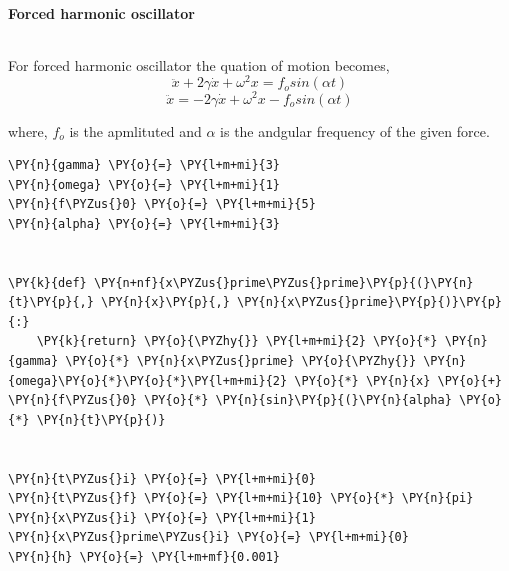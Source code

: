     \hypertarget{forced-harmonic-oscillator}{%
\paragraph{Forced harmonic
oscillator}\label{forced-harmonic-oscillator}}

\[\;\]

    For forced harmonic oscillator the quation of motion becomes,
\[\ddot x + 2 \gamma \dot x + \omega^2 x = f_o sin(\alpha t)\]
\[\ddot x = - 2 \gamma \dot x + \omega^2 x - f_o sin(\alpha t)\]

where, \(f_o\) is the apmlituted and \(\alpha\) is the andgular
frequency of the given force.

    \begin{tcolorbox}[breakable, size=fbox, boxrule=1pt, pad at break*=1mm,colback=cellbackground, colframe=cellborder]
\begin{Verbatim}[commandchars=\\\{\}]
\PY{n}{gamma} \PY{o}{=} \PY{l+m+mi}{3}
\PY{n}{omega} \PY{o}{=} \PY{l+m+mi}{1}
\PY{n}{f\PYZus{}0} \PY{o}{=} \PY{l+m+mi}{5}
\PY{n}{alpha} \PY{o}{=} \PY{l+m+mi}{3}


\PY{k}{def} \PY{n+nf}{x\PYZus{}prime\PYZus{}prime}\PY{p}{(}\PY{n}{t}\PY{p}{,} \PY{n}{x}\PY{p}{,} \PY{n}{x\PYZus{}prime}\PY{p}{)}\PY{p}{:}
    \PY{k}{return} \PY{o}{\PYZhy{}} \PY{l+m+mi}{2} \PY{o}{*} \PY{n}{gamma} \PY{o}{*} \PY{n}{x\PYZus{}prime} \PY{o}{\PYZhy{}} \PY{n}{omega}\PY{o}{*}\PY{o}{*}\PY{l+m+mi}{2} \PY{o}{*} \PY{n}{x} \PY{o}{+} \PY{n}{f\PYZus{}0} \PY{o}{*} \PY{n}{sin}\PY{p}{(}\PY{n}{alpha} \PY{o}{*} \PY{n}{t}\PY{p}{)}


\PY{n}{t\PYZus{}i} \PY{o}{=} \PY{l+m+mi}{0}
\PY{n}{t\PYZus{}f} \PY{o}{=} \PY{l+m+mi}{10} \PY{o}{*} \PY{n}{pi}
\PY{n}{x\PYZus{}i} \PY{o}{=} \PY{l+m+mi}{1}
\PY{n}{x\PYZus{}prime\PYZus{}i} \PY{o}{=} \PY{l+m+mi}{0}
\PY{n}{h} \PY{o}{=} \PY{l+m+mf}{0.001}
\end{Verbatim}
\end{tcolorbox}

